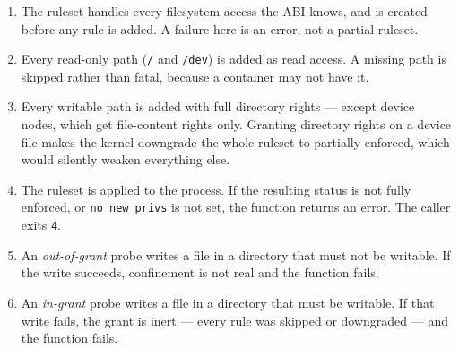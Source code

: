 \begin{enumerate}
	\item The ruleset handles every filesystem access the ABI knows, and is created before any
	rule is added. A failure here is an error, not a partial ruleset.
	\item Every read-only path (\texttt{/} and \texttt{/dev}) is added as read access. A
	missing path is skipped rather than fatal, because a container may not have it.
	\item Every writable path is added with full directory rights --- except device nodes,
	which get file-content rights only. Granting directory rights on a device file makes the
	kernel downgrade the whole ruleset to partially enforced, which would silently weaken
	everything else.
	\item The ruleset is applied to the process. If the resulting status is not fully enforced,
	or \texttt{no\_new\_privs} is not set, the function returns an error. The caller exits
	\texttt{4}.
	\item An \emph{out-of-grant} probe writes a file in a directory that must not be writable.
	If the write succeeds, confinement is not real and the function fails.
	\item An \emph{in-grant} probe writes a file in a directory that must be writable. If that
	write fails, the grant is inert --- every rule was skipped or downgraded --- and the
	function fails.
\end{enumerate}

\begin{center}
\end{center}

